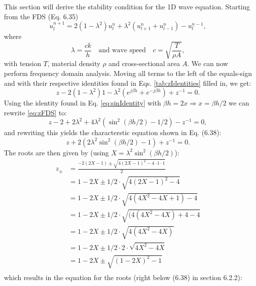 {{This section will derive the stability condition for the 1D wave equation. Starting from the FDS (Eq. 6.35)
\begin{equation}
    u_l^{n+1} = 2(1-\lambda^2)u_l^n + \lambda^2(u_{l+1}^n+u_{l-1}^n)-u_l^{n-1},
\end{equation}
where
\begin{equation}\label{eq:lambda}
    \lambda = \frac{ck}{h} \quad \text{and wave speed} \quad c = \sqrt{\frac{T}{\rho A}},
\end{equation}
with tension $T$, material density $\rho$ and cross-sectional area $A$.
We can now perform frequency domain analysis. Moving all terms to the left of the equals-sign and with their respective identities found in Eqs. \eqref{tab:zIdentities} filled in, we get:
\begin{equation}\label{eq:zFDS}
    z - 2(1-\lambda^2)1 - \lambda^2(e^{j\beta h}+e^{-j\beta h}) + z^{-1} = 0.
\end{equation}
Using the identity found in Eq. \eqref{eq:sinIdentity} with $\beta h = 2x \Rightarrow x = \beta h / 2$ we can rewrite \eqref{eq:zFDS} to:
\begin{equation}
     z - 2 + 2\lambda^2 +4\lambda^2(\sin^2({\beta h / 2}) - 1/2) - z^{-1} = 0,
\end{equation}
and rewriting this yields the characterstic equation shown in Eq. (6.38):
\begin{equation}\label{eq:characteristic1D}
     z + 2(2\lambda^2\sin^2(\beta h/2) - 1) + z^{-1} = 0.
\end{equation}
The roots are then given by (using $X = \lambda^2\sin^2(\beta h/2)$):
\begin{equation}
\begin{aligned}\nonumber
    z_\pm &= \frac{-2(2X-1) \pm \sqrt{4(2X-1)^2 - 4 \cdot 1 \cdot 1}}{2}\\
    &= 1-2X \pm 1/2 \cdot \sqrt{4(2X-1)^2 - 4}\\
    &= 1-2X \pm 1/2 \cdot \sqrt{4(4X^2-4X + 1) - 4}\\
    &= 1-2X \pm 1/2 \cdot \sqrt{(4(4X^2 - 4X) + 4 - 4}\\
    &= 1-2X \pm 1/2 \cdot \sqrt{4(4X^2 - 4X)}\\
    &= 1-2X \pm 1/2 \cdot 2 \cdot \sqrt{4X^2 - 4X}\\
    &= 1-2X \pm \sqrt{(1 - 2X)^2 - 1}\\
\end{aligned}
\end{equation}
which results in the equation for the roots (right below (6.38) in section 6.2.2):
}}
